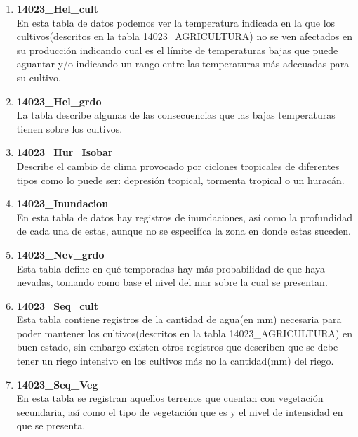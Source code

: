 \documentclass[10pt,letterpaper]{article}
\begin{document}
\begin{enumerate}
\item \textbf{14023\_Hel\_cult}\\

En esta tabla de datos podemos ver la temperatura indicada en la que los cultivos(descritos en la tabla 14023\_AGRICULTURA) no se ven afectados en su producci\'on indicando cual es el l\'imite de temperaturas bajas que puede aguantar y/o indicando un rango entre las temperaturas m\'as adecuadas para su cultivo.

\item \textbf{14023\_Hel\_grdo}\\

La tabla describe algunas de las consecuencias que las bajas temperaturas tienen sobre los cultivos.

\item \textbf{14023\_Hur\_Isobar}\\

Describe el cambio de clima provocado por ciclones tropicales de diferentes tipos como lo puede ser: depresi\'on tropical, tormenta tropical o un hurac\'an.

\item \textbf{14023\_Inundacion}\\

En esta tabla de datos hay registros de inundaciones, as\'i como la profundidad de cada una de estas, aunque no se especif\'ica la zona en donde estas suceden.

\item \textbf{14023\_Nev\_grdo}\\

Esta tabla define en qu\'e temporadas hay m\'as probabilidad de que haya nevadas, tomando como base el nivel del mar sobre la cual se presentan.

\item \textbf{14023\_Seq\_cult}\\

Esta tabla contiene registros de la cantidad de agua(en mm) necesaria para poder mantener los cultivos(descritos en la tabla 14023\_AGRICULTURA) en buen estado, sin embargo existen otros registros que describen que se debe tener un riego intensivo en los cultivos m\'as no la cantidad(mm) del riego.

\item \textbf{14023\_Seq\_Veg}\\

En esta tabla se registran aquellos terrenos que cuentan con vegetaci\'on secundaria, as\'i como el tipo de vegetaci\'on que es y el nivel de intensidad en que se presenta.


\end{enumerate}
\end{document}
